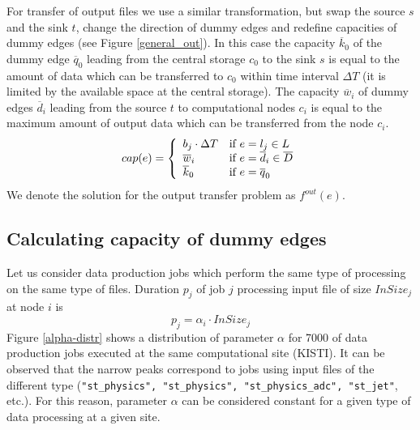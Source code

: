 \documentclass[english]{ddny}
\begin{document}
For transfer of output files we use a similar transformation, but swap the
source $s$ and the sink $t$, change the direction of dummy edges and redefine
capacities of dummy edges (see Figure \ref{general_out}). In this case the capacity $\overline{k}_{0}$ of the
dummy edge $\overline{q}_{0}$ leading from the central storage $c_0$ to the
sink $s$ is equal to the amount of data which can be transferred to $c_0$
within time interval $\Delta T$ (it is limited by the available space at the
central storage). The capacity $\overline{w}_{i}$ of dummy edges
$\overline{d}_{i}$ leading from the source $t$ to computational nodes $c_{i}$
is equal to the maximum amount of output data which can be transferred from
the node $c_{i}$.
%
\begin{equation}
\label{edge_cap_out}
cap(e) = \left\{ 
  \begin{array}{l l}
    b_{j} \cdot \Delta T & \text{if }e = l_{j} \in L \\
    \overline{w}_{i} & \text{if } e = \overline{d}_{i} \in \overline{D}\\
    \overline{k}_{0} & \text{if } e = \overline{q}_{0}
  \end{array} \right.
\end{equation}
%
We denote the solution for the output transfer problem as $f^{out}(e)$.

\subsection{Calculating capacity of dummy edges}
\label{dummycap}
Let us consider data production jobs which perform the same type of processing on the same type of files.
Duration $p_{j}$ of job $j$  processing input file of size $InSize_{j}$ at node $i$ is
\begin{equation}
\label{alpha}
p_{j} = \alpha_{i} \cdot InSize_{j} 
\end{equation}
Figure \ref{alpha-distr} shows a distribution of parameter $\alpha$ for 7000 of data production jobs executed at the same computational site (KISTI). It can be observed that the narrow peaks correspond to jobs using input files of the different type (\texttt{"st\_physics", "st\_physics", "st\_physics\_adc", "st\_jet"}, etc.). For this reason, parameter $\alpha$ can be considered constant for a given type of data processing at a given site. 
\end{document}
